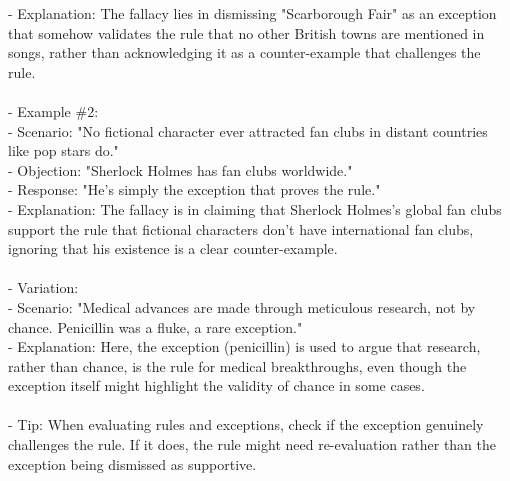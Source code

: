 \documentclass[a4paper,12pt,single,pdftex]{scrbook}
\begin{document}
    
        - Explanation: The fallacy lies in dismissing "Scarborough Fair" as an exception that somehow validates the rule that no other British towns are mentioned in songs, rather than acknowledging it as a counter-example that challenges the rule.
    \\

    
      
    \\

    
      - Example \#2:
    \\

    
        - Scenario: "No fictional character ever attracted fan clubs in distant countries like pop stars do."
    \\

    
        - Objection: "Sherlock Holmes has fan clubs worldwide."
    \\

    
        - Response: "He’s simply the exception that proves the rule."
    \\

    
        - Explanation: The fallacy is in claiming that Sherlock Holmes’s global fan clubs support the rule that fictional characters don’t have international fan clubs, ignoring that his existence is a clear counter-example.
    \\

    
      
    \\

    
      - Variation:
    \\

    
        - Scenario: "Medical advances are made through meticulous research, not by chance. Penicillin was a fluke, a rare exception."
    \\

    
        - Explanation: Here, the exception (penicillin) is used to argue that research, rather than chance, is the rule for medical breakthroughs, even though the exception itself might highlight the validity of chance in some cases.
    \\

    
      
    \\

    
      - Tip: When evaluating rules and exceptions, check if the exception genuinely challenges the rule. If it does, the rule might need re-evaluation rather than the exception being dismissed as supportive.
    \\
\end{document}
